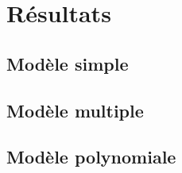 \documentclass[french]{article}
\begin{document}
\newpage

\section{Résultats}
\subsection{Modèle simple}

\subsection{Modèle multiple}

\subsection{Modèle polynomiale}

\newpage
\end{document}

